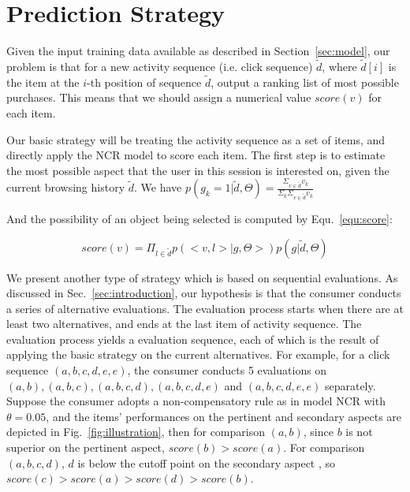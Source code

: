 \documentclass[sigconf]{acmart}
\begin{document}
\section{Prediction Strategy}\label{sec:strategy}

Given the input training data available as described in Section~\ref{sec:model}, our problem is that for a new activity sequence (i.e. click sequence) $\tilde{d}$,  where $\tilde{d}[i]$ is the item at the $i$-th position of sequence $\tilde{d}$,  output a ranking list of most possible purchases. This means that we should assign a numerical value $score(v)$ for each item. 
 
Our basic strategy will be treating the activity sequence as a set of items, and directly apply the NCR model to score each item.  The first step is to estimate the most possible aspect that the user in this session is interested on, given the current browsing history $\tilde{d}$. We have $p(g_k=1|\tilde{d},\Theta)=\frac{\Sigma_{v\in \tilde{d}} v_k}{\Sigma_k \Sigma_{v\in \tilde{d}} v_k}$

And the possibility of an object being selected is computed by Equ.~\ref{equ:score}: 

\begin{equation}\label{equ:score}
score(v)=\Pi_{l \in \tilde{d}} p(<v, l>|g,\Theta>)p(g|\tilde{d},\Theta)
\end{equation}

We present another type of strategy which is based on sequential evaluations. As discussed in Sec.~\ref{sec:introduction}, our hypothesis is that the consumer conducts a series of alternative evaluations. The evaluation process starts when there are at least two alternatives, and ends at the last item of activity sequence. The evaluation process yields a evaluation sequence, each of which is the result of applying the basic strategy on the current alternatives. For example, for a click sequence $(a,b,c,d,e,e)$, the consumer conducts 5 evaluations on $(a,b), (a,b,c), (a,b,c,d),(a,b,c,d,e)$ and $(a,b,c,d,e,e) $ separately. Suppose the consumer adopts a non-compensatory rule as in model NCR with $\theta=0.05$, and the items' performances on the pertinent and secondary aspects are depicted in Fig.~\ref{fig:illustration}, then for comparison $(a,b)$, since $b$ is not superior on the pertinent aspect, $score(b)>score(a)$. For comparison $(a,b,c,d)$,  $d$ is below the cutoff point on the secondary aspect , so $score(c)>score(a)>score(d)>score(b)$. 
\end{document}
